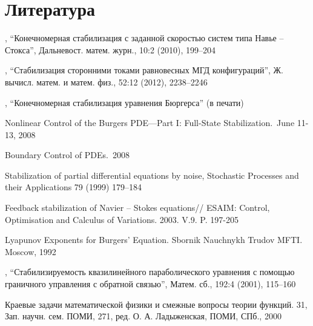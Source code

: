 \section*{Литература}

\vspace{2em}

\begingroup
\renewcommand{\section}[2]{}%

\begin{thebibliography}{}
    , “Конечномерная
        стабилизация с заданной скоростью систем типа Навье – Стокса”,
        Дальневост. матем. журн., 10:2 (2010), 199–204 

    , “Стабилизация
        сторонними токами равновесных МГД конфигураций”, Ж. вычисл. матем. и
        матем. физ., 52:12 (2012), 2238–2246

    , “Конечномерная стабилизация
        уравнения Бюргерса” (в печати)

     Nonlinear 
        Control of the Burgers PDE—Part I: Full-State Stabilization.\ June 11-13, 2008

     Boundary Control of PDEs.\ 2008

     Stabilization of partial differential
        equations by noise, Stochastic Processes and their Applications 79
        (1999) 179–184

     Feedback stabilization of Navier – Stokes
        equations// ESAIM: Control, Optimisation and Calculus of Variations. 
        2003. V.9. P. 197-205

     Lyapunov Exponents for Burgers’ Equation. 
        Sbornik Nauchnykh Trudov MFTI. Moscow, 1992

    , “Стабилизируемость квазилинейного
            параболического уравнения с помощью граничного управления с обратной
            связью”, Матем. сб., 192:4 (2001), 115–160

    \bibitem{} Краевые задачи математической физики и смежные вопросы теории
        функций. 31, Зап. научн. сем. ПОМИ, 271, ред. О. А. Ладыженская, ПОМИ,
        СПб., 2000


\end{thebibliography}
